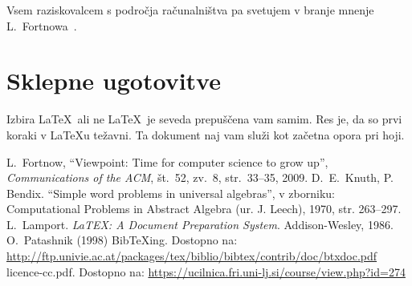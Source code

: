\documentclass[a4paper, 12pt]{book}
\newcommand{\BibTeX}{{\sc Bib}\TeX}
\begin{document}
Vsem raziskovalcem s področja računalništva pa svetujem v branje mnenje L.\ Fortnowa~\cite{lf}.

\chapter{Sklepne ugotovitve}
Izbira \LaTeX\ ali ne \LaTeX\ je seveda prepuščena vam samim. Res je, da so prvi koraki v \LaTeX{}u težavni. Ta dokument naj vam služi kot začetna opora pri hoji.

\begin{thebibliography}{99}
 L.\ Fortnow, ``Viewpoint: Time for computer science to grow up'',
{\it Communications of the ACM}, št.\ 52, zv.\ 8, str.\ 33--35, 2009.
 D.\ E.\ Knuth, P. Bendix. ``Simple word problems in universal algebras'', v zborniku: Computational Problems in Abstract Algebra (ur. J. Leech), 1970, str. 263--297.
 L.\ Lamport. {\it LaTEX: A Document Preparation System}. Addison-Wesley, 1986.
 O.\ Patashnik (1998) \BibTeX{}ing.
Dostopno na: \url{http://ftp.univie.ac.at/packages/tex/biblio/bibtex/contrib/doc/btxdoc.pdf}
 licence-cc.pdf. Dostopno na: \url{https://ucilnica.fri.uni-lj.si/course/view.php?id=274}
\end{thebibliography}
\end{document}

